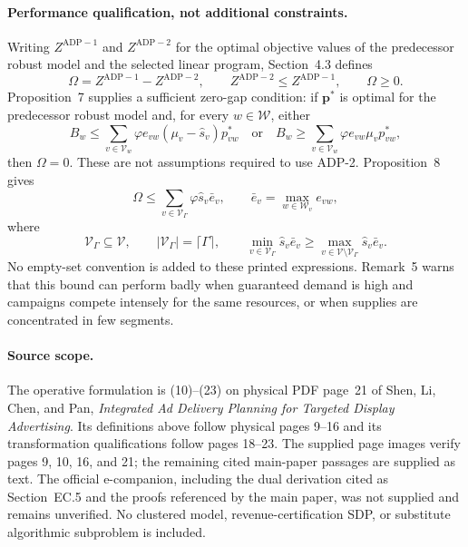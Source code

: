 \documentclass{article}
\begin{document}
\paragraph{Performance qualification, not additional constraints.}
Writing $Z^{\mathrm{ADP}-1}$ and $Z^{\mathrm{ADP}-2}$ for the optimal objective values of the predecessor robust model and the selected linear program, Section~4.3 defines
\[
\Omega=Z^{\mathrm{ADP}-1}-Z^{\mathrm{ADP}-2},\qquad
Z^{\mathrm{ADP}-2}\leq Z^{\mathrm{ADP}-1},\qquad\Omega\geq0.
\]
Proposition~7 supplies a sufficient zero-gap condition: if $\boldsymbol p^*$ is optimal for the predecessor robust model and, for every $w\in\mathcal W$, either
\[
B_w\leq\sum_{v\in\mathcal V_w}\varphi e_{vw}(\mu_v-\hat s_v)p^*_{vw}
\quad\text{or}\quad
B_w\geq\sum_{v\in\mathcal V_w}\varphi e_{vw}\mu_vp^*_{vw},
\]
then $\Omega=0$. These are not assumptions required to use ADP-2. Proposition~8 gives
\[
\Omega\leq\sum_{v\in\mathcal V_\Gamma}\varphi\hat s_v\bar e_v,
\qquad
\bar e_v=\max_{w\in\mathcal W_v}e_{vw},
\]
where
\[
\mathcal V_\Gamma\subseteq\mathcal V,\qquad
|\mathcal V_\Gamma|=\lceil\Gamma\rceil,\qquad
\min_{v\in\mathcal V_\Gamma}\hat s_v\bar e_v
\geq\max_{v\in\mathcal V\setminus\mathcal V_\Gamma}\hat s_v\bar e_v.
\]
No empty-set convention is added to these printed expressions. Remark~5 warns that this bound can perform badly when guaranteed demand is high and campaigns compete intensely for the same resources, or when supplies are concentrated in few segments.

\paragraph{Source scope.}
The operative formulation is (10)--(23) on physical PDF page~21 of Shen, Li, Chen, and Pan, \emph{Integrated Ad Delivery Planning for Targeted Display Advertising}. Its definitions above follow physical pages 9--16 and its transformation qualifications follow pages 18--23. The supplied page images verify pages 9, 10, 16, and 21; the remaining cited main-paper passages are supplied as text. The official e-companion, including the dual derivation cited as Section~EC.5 and the proofs referenced by the main paper, was not supplied and remains unverified. No clustered model, revenue-certification SDP, or substitute algorithmic subproblem is included.
\end{document}
